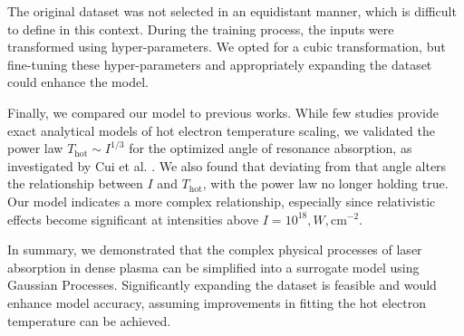 The original dataset was not selected in an equidistant manner, which is difficult to define in this context. During the training process, the inputs were transformed using hyper-parameters. We opted for a cubic transformation, but fine-tuning these hyper-parameters and appropriately expanding the dataset could enhance the model.

Finally, we compared our model to previous works. While few studies provide exact analytical models of hot electron temperature scaling, we validated the power law $T_\mathrm{hot} \sim I^{1/3}$ for the optimized angle of resonance absorption, as investigated by Cui et al. \cite{cui2013}. We also found that deviating from that angle alters the relationship between $I$ and $T_\mathrm{hot}$, with the power law no longer holding true. Our model indicates a more complex relationship, especially since relativistic effects become significant at intensities above $I = 10^{18} , W , \mathrm{cm}^{-2}$.

In summary, we demonstrated that the complex physical processes of laser absorption in dense plasma can be simplified into a surrogate model using Gaussian Processes. Significantly expanding the dataset is feasible and would enhance model accuracy, assuming improvements in fitting the hot electron temperature can be achieved.



